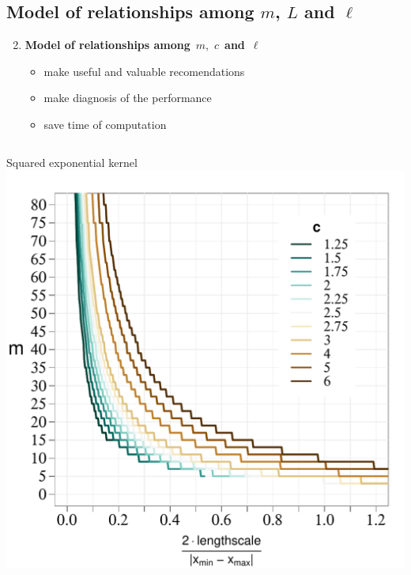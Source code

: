 \documentclass[8pt]{beamer} %
\begin{document}
\subsection*{Model of relationships among $m$, $L$ and $\ell$}
\begin{frame}

\begin{enumerate}\setcounter{enumi}{1}
\item \textbf{Model of relationships among}\, $m$,\, $c$\, \textbf{and}\, $\ell$ \\[2mm]

 \begin{itemize}
 \item make useful and valuable {\color{navyblue} recomendations} 
 \item make {\color{navyblue} diagnosis} of the performance 
 \item save time of computation 
 \end{itemize}
\end{enumerate}

\vspace{3mm}
\begin{columns}

\hspace{5mm} \centering \scriptsize Squared exponential kernel\\
\includegraphics[scale=0.25, trim = 0mm 0mm 5mm 10mm, clip]{ch5_fig6_lscale_vs_J_vs_c_zoomin.pdf}


\end{columns}
\end{frame}
\end{document}
